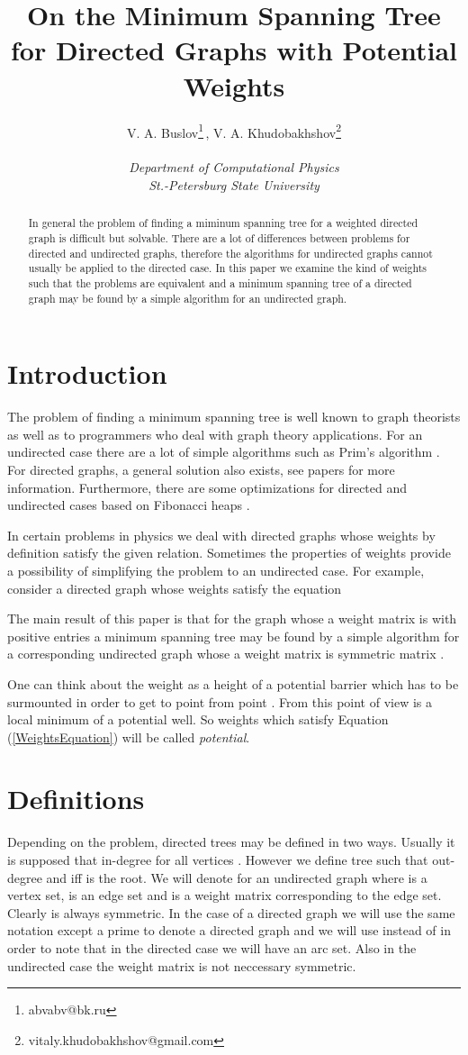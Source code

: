 \documentclass[10pt]{article}
\title{On the Minimum Spanning Tree for Directed Graphs with Potential Weights}
\author{V. A. Buslov\thanks{abvabv@bk.ru}\,,
 V. A. Khudobakhshov\thanks{vitaly.khudobakhshov@gmail.com}
 \\ \\ \textit{Department of
Computational Physics} \\ \textit{St.-Petersburg State
University}}
\begin{document}
\maketitle


\begin{abstract}
In general the problem of finding a miminum spanning tree for a weighted
directed graph is difficult but solvable. There are a lot of differences
between problems for directed and undirected graphs, therefore the algorithms
for undirected graphs cannot usually be applied to the directed case. In this
paper we examine the kind of weights such that the problems are equivalent
and a minimum spanning tree of a directed graph may be found by a simple
algorithm for an undirected graph.
\end{abstract}

\section{Introduction}
The problem of finding a minimum spanning tree is well known to graph theorists
as well as to programmers who deal with graph theory applications. For
an undirected case there are a lot of simple algorithms such as Prim's algorithm
\cite{Prim:57}. For directed graphs, a general solution also exists, see papers
\cite{Bock:71, Chu-Liu:65, Edmonds:67} for more information. Furthermore, there
are some optimizations for directed and undirected cases based on Fibonacci
heaps \cite{Gab-Gal-Spe:86}.

In certain problems in physics we deal with directed graphs whose weights
by definition satisfy the given relation. Sometimes the properties of weights
provide a possibility of simplifying the problem to an undirected case. For
example, consider a directed graph whose weights satisfy the equation 

The main result of this paper is that for the graph whose a weight matrix is 
with positive entries a minimum spanning tree may be found by a simple algorithm
for a corresponding undirected graph whose a weight matrix is symmetric
matrix .

One can think about the weight  as a height of a potential barrier
which has to be surmounted in order to get to point  from point . From
this point of view  is a local minimum of a potential well.
So weights which satisfy Equation (\ref{WeightsEquation}) will be called
\emph{potential}.

\section{Definitions}
Depending on the problem, directed trees may be defined in two ways. 
Usually it is supposed that in-degree  for all vertices .
However we define tree such that out-degree  and 
iff  is the root. We will denote  for an undirected graph
where  is a vertex set,  is an edge set and  is a weight matrix
corresponding to the edge set. Clearly  is always symmetric. In the case
of a directed graph we will use the same notation except a prime to denote
a directed graph and we will use  instead of  in order to note that in
the directed case we will have an arc set. Also in the undirected case the
weight matrix is not neccessary symmetric.   
\end{document}
